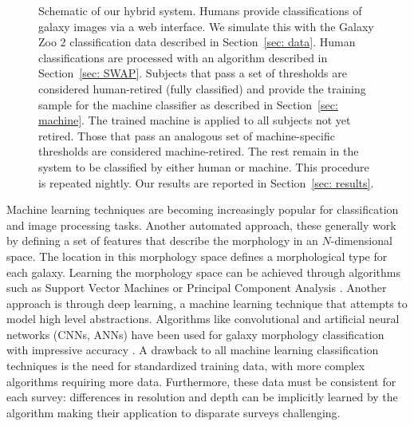 \documentclass[twocolumn,  trackchanges,]{aastex6}%
\begin{document}
\begin{figure}[ht!]
\caption{Schematic of our hybrid system. Humans provide classifications of galaxy images via a web interface. We simulate this with the Galaxy Zoo 2 classification data described in Section~\ref{sec: data}. Human classifications are processed with an algorithm described in Section~\ref{sec: SWAP}. Subjects that pass a set of thresholds are considered human-retired (fully classified) and provide the training sample for the machine classifier as described in Section~\ref{sec: machine}. The trained machine is applied to all subjects not yet retired. Those that pass an analogous set of machine-specific thresholds are considered machine-retired. The rest remain in the system to be classified by either human or machine. This procedure is repeated  nightly. Our results are reported in Section~\ref{sec: results}.  \label{fig: schematic}}
\end{figure}

Machine learning techniques are becoming increasingly popular for classification 
and image processing tasks. Another automated approach, these generally work
by defining a set of features that describe the morphology in an $N$-dimensional space. 
The location in this morphology space defines a morphological type for each galaxy.
Learning the morphology space can be achieved through algorithms such as 
Support Vector Machines \citep{HuertasCompany2008} 
or Principal Component Analysis \citep{Watanabe1985, Scarlata2007}.  
Another approach is through deep learning, a machine learning technique that attempts 
to model high level abstractions. Algorithms like convolutional and artificial 
neural networks (CNNs, ANNs) have been used for galaxy morphology classification 
with impressive accuracy 
\citep{Ball2004, 
	Banerji2010, 
	Dieleman2015, 
	HuertasCompany2015}. 
A drawback to all machine learning classification techniques is the need for 
standardized training data, with more complex algorithms requiring more data. 
Furthermore, these data must be consistent for each survey: differences in resolution 
and depth can be implicitly learned by the algorithm making their application to 
disparate surveys challenging.  
\end{document}
